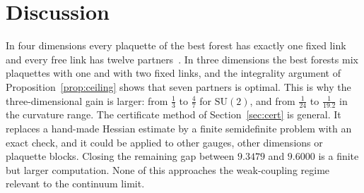 \documentclass[11pt]{amsart}
\theoremstyle{definition}
\theoremstyle{remark}
\newcommand{\SU}{\mathrm{SU}}
\begin{document}
\section{Discussion}

In four dimensions every plaquette of the best forest has exactly one fixed link and every free link has twelve
partners~\cite{BBL}. In three dimensions the best forests mix plaquettes with one and with two fixed links, and the
integrality argument of Proposition~\ref{prop:ceiling} shows that seven partners is optimal. This is why the
three-dimensional gain is larger: from $\frac13$ to $\frac47$ for $\SU(2)$, and from $\frac1{24}$ to $\frac1{19.2}$ in
the curvature range. The certificate method of Section~\ref{sec:cert} is general. It replaces a hand-made Hessian
estimate by a finite semidefinite problem with an exact check, and it could be applied to other gauges, other
dimensions or plaquette blocks. Closing the remaining gap between $9.3479$ and $9.6000$ is a finite but larger
computation. None of this approaches the weak-coupling regime relevant to the continuum limit.

\appendix
\end{document}
